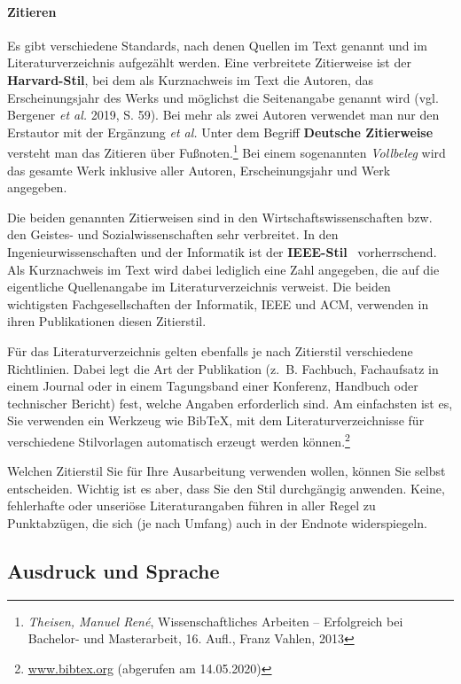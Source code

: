 \paragraph{Zitieren}

Es gibt verschiedene Standards, nach denen Quellen im Text genannt und im Literaturverzeichnis aufgezählt werden.
Eine verbreitete Zitierweise ist der \textbf{Harvard-Stil}, bei dem als Kurznachweis im Text die Autoren, das Erscheinungsjahr des Werks und möglichst die Seitenangabe genannt wird  (vgl. Bergener \textit{et al.} 2019, S. 59).\nocite{Bergener2019}
Bei mehr als zwei Autoren verwendet man nur den Erstautor mit der Ergänzung \textit{et al.}
Unter dem Begriff \textbf{Deutsche Zitierweise} versteht man das Zitieren über Fußnoten.\footnote{\textit{Theisen, Manuel René}, Wissenschaftliches Arbeiten -- Erfolgreich bei Bachelor- und Masterarbeit, 16. Aufl., Franz Vahlen, 2013}\nocite{Theisen2013}
Bei einem sogenannten \textit{Vollbeleg} wird das gesamte Werk inklusive aller Autoren, Erscheinungsjahr und Werk angegeben.

Die beiden genannten Zitierweisen sind in den Wirtschaftswissenschaften bzw. den Geistes- und Sozialwissenschaften sehr verbreitet.
In den Ingenieurwissenschaften und der Informatik ist der \textbf{IEEE-Stil}~\cite{ieeestyle} vorherrschend.
Als Kurznachweis im Text wird dabei lediglich eine Zahl angegeben, die auf die eigentliche Quellenangabe im Literaturverzeichnis verweist.
Die beiden wichtigsten Fachgesellschaften der Informatik, IEEE und ACM, verwenden in ihren Publikationen diesen Zitierstil.

Für das Literaturverzeichnis gelten ebenfalls je nach Zitierstil verschiedene Richtlinien.
Dabei legt die Art der Publikation (z.~B. Fachbuch, Fachaufsatz in einem Journal oder in einem Tagungsband einer Konferenz, Handbuch oder technischer Bericht) fest, welche Angaben erforderlich sind.
Am einfachsten ist es, Sie verwenden ein Werkzeug wie BibTeX, mit dem Literaturverzeichnisse für verschiedene Stilvorlagen automatisch erzeugt werden können.\footnote{\url{www.bibtex.org} (abgerufen am 14.05.2020)} 

Welchen Zitierstil Sie für Ihre Ausarbeitung verwenden wollen, können Sie selbst entscheiden.
Wichtig ist es aber, dass Sie den Stil durchgängig anwenden.
Keine, fehlerhafte oder unseriöse Literaturangaben führen in aller Regel zu Punktabzügen, die sich (je nach Umfang) auch in der Endnote widerspiegeln.

\subsection{Ausdruck und Sprache}


